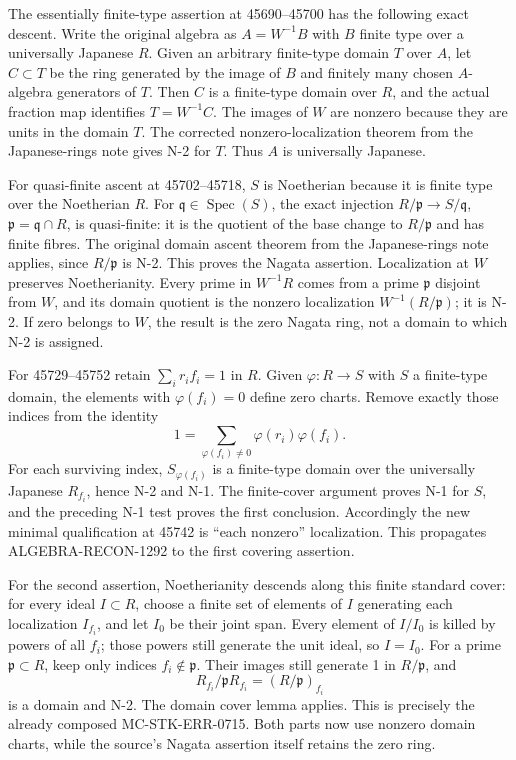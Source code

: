 The essentially finite-type assertion at 45690--45700 has the following exact descent. Write the original algebra as \(A=W^{-1}B\) with \(B\) finite type over a universally Japanese \(R\). Given an arbitrary finite-type domain \(T\) over \(A\), let \(C\subset T\) be the ring generated by the image of \(B\) and finitely many chosen \(A\)-algebra generators of \(T\). Then \(C\) is a finite-type domain over \(R\), and the actual fraction map identifies \(T=W^{-1}C\). The images of \(W\) are nonzero because they are units in the domain \(T\). The corrected nonzero-localization theorem from the Japanese-rings note gives N-2 for \(T\). Thus \(A\) is universally Japanese.

For quasi-finite ascent at 45702--45718, \(S\) is Noetherian because it is finite type over the Noetherian \(R\). For \(\mathfrak q\in\operatorname{Spec}(S)\), the exact injection \(R/\mathfrak p\to S/\mathfrak q\), \(\mathfrak p=\mathfrak q\cap R\), is quasi-finite: it is the quotient of the base change to \(R/\mathfrak p\) and has finite fibres. The original domain ascent theorem from the Japanese-rings note applies, since \(R/\mathfrak p\) is N-2. This proves the Nagata assertion. Localization at \(W\) preserves Noetherianity. Every prime in \(W^{-1}R\) comes from a prime \(\mathfrak p\) disjoint from \(W\), and its domain quotient is the nonzero localization \(W^{-1}(R/\mathfrak p)\); it is N-2. If zero belongs to \(W\), the result is the zero Nagata ring, not a domain to which N-2 is assigned.

For 45729--45752 retain \(\sum_i r_i f_i=1\) in \(R\). Given \(\varphi:R\to S\) with \(S\) a finite-type domain, the elements with \(\varphi(f_i)=0\) define zero charts. Remove exactly those indices from the identity \[
 1=\sum_{\varphi(f_i)\ne0}\varphi(r_i)\varphi(f_i).
\] For each surviving index, \(S_{\varphi(f_i)}\) is a finite-type domain over the universally Japanese \(R_{f_i}\), hence N-2 and N-1. The finite-cover argument proves N-1 for \(S\), and the preceding N-1 test proves the first conclusion. Accordingly the new minimal qualification at 45742 is ``each nonzero'' localization. This propagates ALGEBRA-RECON-1292 to the first covering assertion.

For the second assertion, Noetherianity descends along this finite standard cover: for every ideal \(I\subset R\), choose a finite set of elements of \(I\) generating each localization \(I_{f_i}\), and let \(I_0\) be their joint span. Every element of \(I/I_0\) is killed by powers of all \(f_i\); those powers still generate the unit ideal, so \(I=I_0\). For a prime \(\mathfrak p\subset R\), keep only indices \(f_i\notin\mathfrak p\). Their images still generate 1 in \(R/\mathfrak p\), and \[
 R_{f_i}/\mathfrak pR_{f_i}=(R/\mathfrak p)_{f_i}
\] is a domain and N-2. The domain cover lemma applies. This is precisely the already composed MC-STK-ERR-0715. Both parts now use nonzero domain charts, while the source's Nagata assertion itself retains the zero ring.

